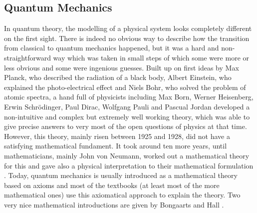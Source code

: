 \subsection{Quantum Mechanics}
\label{subsec:chap2_Quantum}

In quantum theory, the modelling of a physical system looks completely 
different on the first sight. There is indeed no obvious way to describe how 
the transition from classical to quantum mechanics happened, but it was a hard 
and non-straightforward way which was taken in small steps of which some were 
more or less obvious and some were ingenious guesses. Built up on first ideas 
by Max Planck, who described the radiation of a black body, Albert Einstein, 
who explained the photo-electrical effect and Niels Bohr, who solved the 
problem of atomic spectra, a hand full of physicists including Max Born, 
Werner Heisenberg, Erwin Schr\"odinger, Paul Dirac, Wolfgang Pauli and Pascual 
Jordan developed a non-intuitive and complex but extremely well working theory, 
which was able to give precise answers to very most of the open questions of 
physics at that time. However, this theory, mainly risen between 1925 and 1928, 
did not have a satisfying mathematical fundament. It took around ten more 
years, until mathematicians, mainly John von Neumann, worked out a mathematical 
theory for this and gave also a physical interpretation to their mathematical 
formulation \cite{vonneumann:1996a}. Today, quantum mechanics is usually 
introduced as a mathematical theory based on axioms and most of the textbooks 
(at least most of the more mathematical ones) use this axiomatical approach to 
explain the theory. Two very nice mathematical introductions are given by 
Bongaarts \cite{bongaarts:2015a} and Hall \cite{hall:2013a}.


